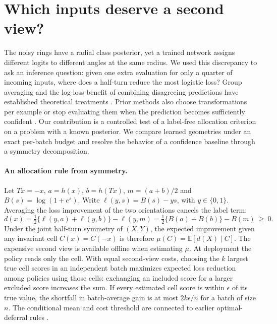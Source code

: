 \section{Which inputs deserve a second view?}
\label{sec:budgeted-rotation}

The noisy rings have a radial class posterior, yet a trained network assigns different logits to different angles at the same radius. We used this discrepancy to ask an inference question: given one extra evaluation for only a quarter of incoming inputs, where does a half-turn reduce the most logistic loss? Group averaging and the log-loss benefit of combining disagreeing predictions have established theoretical treatments \cite{lyle2020invariance,wood2023diversity}. Prior methods also choose transformations per example or stop evaluating them when the prediction becomes sufficiently confident \cite{kim2020learningloss,mocerino2021adaptta}. Our contribution is a controlled test of a label-free allocation criterion on a problem with a known posterior. We compare learned geometries under an exact per-batch budget and resolve the behavior of a confidence baseline through a symmetry decomposition.

\paragraph{An allocation rule from symmetry.}
Let $T x=-x$, $a=h(x)$, $b=h(Tx)$, $m=(a+b)/2$ and $B(s)=\log(1+e^s)$. Write $\ell(y,s)=B(s)-ys$, with $y\in\{0,1\}$. Averaging the loss improvement of the two orientations cancels the label term:
\[
d(x)=\tfrac12\{\ell(y,a)+\ell(y,b)\}-\ell(y,m)
    =\tfrac12\{B(a)+B(b)\}-B(m)\ \geq\ 0.
\]
Under the joint half-turn symmetry of $(X,Y)$, the expected improvement given any invariant cell $C(x)=C(-x)$ is therefore $\mu(C)=\mathbb E[d(X)\mid C]$. The expensive second view is available offline when estimating $\mu$. At deployment the policy reads only the cell. With equal second-view costs, choosing the $k$ largest true cell scores in an independent batch maximizes expected loss reduction among policies using those cells: exchanging an included score for a larger excluded score increases the sum. If every estimated cell score is within $\epsilon$ of its true value, the shortfall in batch-average gain is at most $2k\epsilon/n$ for a batch of size $n$. The conditional mean and cost threshold are connected to earlier optimal-deferral rules \cite{jitkrittum2023cascade}.

